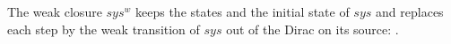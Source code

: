 \begin{definition}
  \label{def:weakclosure}
  \leanok
  The weak closure $sys^w$ keeps the states and the initial state of $sys$ and replaces each step by the weak transition of $sys$ out of the Dirac on its source: .
\end{definition}
